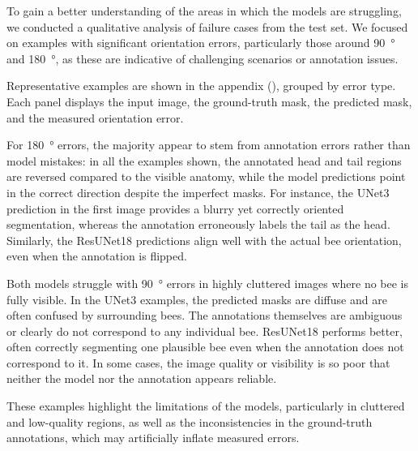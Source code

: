 To gain a better understanding of the areas in which the models are struggling, we conducted a qualitative analysis of failure cases from the test set.
We focused on examples with significant orientation errors, particularly those around \qty{90}{\degree} and \qty{180}{\degree}, as these are indicative of challenging scenarios or annotation issues.

Representative examples are shown in the appendix (), grouped by error type. Each panel displays the input image, the ground-truth mask, the predicted mask, and the measured orientation error.

For \qty{180}{\degree} errors, the majority appear to stem from annotation errors rather than model mistakes: in all the examples shown, the annotated head and tail regions are reversed compared to the visible anatomy, while the model predictions point in the correct direction despite the imperfect masks.
For instance, the UNet3 prediction in the first image provides a blurry yet correctly oriented segmentation, whereas the annotation erroneously labels the tail as the head.
Similarly, the ResUNet18 predictions align well with the actual bee orientation, even when the annotation is flipped.

Both models struggle with \qty{90}{\degree} errors in highly cluttered images where no bee is fully visible.
In the UNet3 examples, the predicted masks are diffuse and are often confused by surrounding bees.
The annotations themselves are ambiguous or clearly do not correspond to any individual bee.
ResUNet18 performs better, often correctly segmenting one plausible bee even when the annotation does not correspond to it.
In some cases, the image quality or visibility is so poor that neither the model nor the annotation appears reliable.

These examples highlight the limitations of the models, particularly in cluttered and low-quality regions, as well as the inconsistencies in the ground-truth annotations, which may artificially inflate measured errors.
